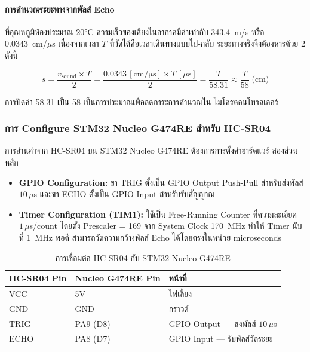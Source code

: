 \paragraph{การคำนวณระยะทางจากพัลส์ Echo}

ที่อุณหภูมิห้องประมาณ 20°C ความเร็วของเสียงในอากาศมีค่าเท่ากับ 343.4~m/s
หรือ 0.0343~cm/$\mu$s เนื่องจากเวลา $T$ ที่วัดได้คือเวลาเดินทางแบบไป-กลับ
ระยะทางจริงจึงต้องหารด้วย 2 ดังนี้

\begin{equation}
    s = \frac{v_{\mathrm{sound}} \times T}{2}
      = \frac{0.0343\,[\mathrm{cm/\mu s}] \times T\,[\mu\mathrm{s}]}{2}
      = \frac{T}{58.31}
      \approx \frac{T}{58} \; \text{(cm)}
    \label{eq:hcsr04_derived}
\end{equation}

การปัดค่า 58.31 เป็น 58 เป็นการประมาณเพื่อลดภาระการคำนวณใน
ไมโครคอนโทรลเลอร์

\subsubsection{การ Configure STM32 Nucleo G474RE สำหรับ HC-SR04}

การอ่านค่าจาก HC-SR04 บน STM32 Nucleo G474RE ต้องการการตั้งค่าฮาร์ดแวร์
สองส่วนหลัก

\begin{itemize}
    \item \textbf{GPIO Configuration:} ขา TRIG ตั้งเป็น GPIO Output Push-Pull
          สำหรับส่งพัลส์ $10\,\mu$s และขา ECHO ตั้งเป็น GPIO Input
          สำหรับรับสัญญาณ
    \item \textbf{Timer Configuration (TIM1):} ใช้เป็น Free-Running Counter
          ที่ความละเอียด $1\,\mu$s/count โดยตั้ง Prescaler = 169
          จาก System Clock 170~MHz ทำให้ Timer นับที่ 1~MHz พอดี
          สามารถวัดความกว้างพัลส์ Echo ได้โดยตรงในหน่วย microseconds
\end{itemize}

\begin{table}[htbp]
    \centering
    \caption{การเชื่อมต่อ HC-SR04 กับ STM32 Nucleo G474RE}
    \label{tab:hcsr04_wiring}
    \begin{tabular}{llp{6cm}}
        \hline
        \textbf{HC-SR04 Pin} & \textbf{Nucleo G474RE Pin} & \textbf{หน้าที่} \\
        \hline
        VCC  & 5V        & ไฟเลี้ยง \\
        GND  & GND       & กราวด์ \\
        TRIG & PA9 (D8)  & GPIO Output --- ส่งพัลส์ $10\,\mu$s \\
        ECHO & PA8 (D7)  & GPIO Input --- รับพัลส์วัดระยะ \\
        \hline
    \end{tabular}
\end{table}

